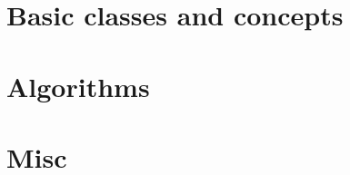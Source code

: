 \documentclass[a4paper]{article}
\begin{document}
	
	\pagebreak


\pagebreak
\section{Basic classes and concepts}
	
	
	\pagebreak
	
	\pagebreak
	
	\pagebreak
	
	\pagebreak
	
	\pagebreak
	


\pagebreak
\section{Algorithms}

	
	\pagebreak
	
	\pagebreak
	
	\pagebreak
	
	\pagebreak
	

\pagebreak
\section{Misc}

	
	\pagebreak
	
\end{document}

